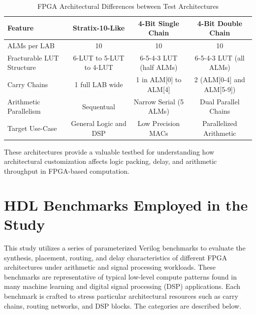 \begin{table}[htb]
	\fontsize{10}{12}\selectfont
	\caption{FPGA Architectural Differences between Test Architectures}
	\label{tab:fpga architectural differences between test architectures}
	\begin{tabular}{|p{3cm}|c|c|c|}
		\hline
		\textbf{Feature}& \textbf {Stratix-10-Like} & \textbf {4-Bit Single Chain} & \textbf{4-Bit Double Chain}\\
		\hline
		ALMs per LAB & 10 & 10 & 10\\\hline
		Fracturable LUT Structure & 6-LUT to 5-LUT to 4-LUT & 6-5-4-3 LUT (half ALMs) & 6-5-4-3 LUT (all ALMs) \\\hline
		Carry Chains & 1 full LAB wide & 1 in ALM[0] to ALM[4] & 2 (ALM[0-4] and ALM[5-9]) \\\hline
		Arithmetic Parallelism & Sequentual & Narrow Serial (5 ALMs) & Dual Parallel Chains \\\hline
		Target Use-Case & General Logic and DSP & Low Precision MACs & Parallelized Arithmetic \\\hline
	\end{tabular}
\end{table}

These architectures provide a valuable testbed for understanding how architectural customization affects logic packing, delay, and arithmetic throughput in FPGA-based computation.


\section{HDL Benchmarks Employed in the Study}
This study utilizes a series of parameterized Verilog benchmarks to evaluate the synthesis, placement, routing, and delay characteristics of different FPGA architectures under arithmetic and signal processing workloads. These benchmarks are representative of typical low-level compute patterns found in many machine learning and digital signal processing (DSP) applications. Each benchmark is crafted to stress particular architectural resources such as carry chains, routing networks, and DSP blocks. The categories are described below.

